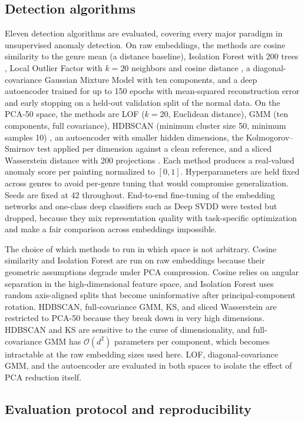\documentclass[conference]{IEEEtran}
\begin{document}
\subsection{Detection algorithms}

Eleven detection algorithms are evaluated, covering every major paradigm in unsupervised anomaly detection. On raw embeddings, the methods are cosine similarity to the genre mean (a distance baseline), Isolation Forest with 200 trees \cite{iforest}, Local Outlier Factor with $k=20$ neighbors and cosine distance \cite{lof}, a diagonal-covariance Gaussian Mixture Model with ten components, and a deep autoencoder trained for up to 150 epochs with mean-squared reconstruction error and early stopping on a held-out validation split of the normal data. On the PCA-50 space, the methods are LOF ($k=20$, Euclidean distance), GMM (ten components, full covariance), HDBSCAN (minimum cluster size 50, minimum samples 10)
\cite{hdbscan}, an autoencoder with smaller hidden dimensions, the
Kolmogorov--Smirnov test applied per dimension against a clean reference, and a sliced Wasserstein distance with 200 projections
\cite{swd}. Each method produces a real-valued anomaly score per
painting normalized to $[0,1]$. Hyperparameters are held fixed across genres to avoid per-genre tuning that would compromise generalization. Seeds are fixed at 42 throughout. End-to-end fine-tuning of the embedding networks and one-class deep classifiers such as Deep SVDD were tested but dropped, because they mix representation quality with task-specific optimization and make a fair comparison across embeddings impossible.

The choice of which methods to run in which space is not arbitrary. Cosine similarity and Isolation Forest are run on raw embeddings because their geometric assumptions degrade under PCA compression. Cosine relies on angular separation in the high-dimensional feature space, and Isolation Forest uses random axis-aligned splits that become uninformative after principal-component rotation. HDBSCAN, full-covariance GMM, KS, and sliced Wasserstein are restricted to PCA-50 because they break down in very high dimensions. HDBSCAN and KS are sensitive to the curse of dimensionality, and full-covariance GMM has $\mathcal{O}(d^2)$ parameters per component, which becomes intractable at the raw embedding sizes used here. LOF, diagonal-covariance GMM, and the autoencoder are evaluated in both spaces to isolate the effect of PCA reduction itself.

\subsection{Evaluation protocol and reproducibility}
\end{document}
